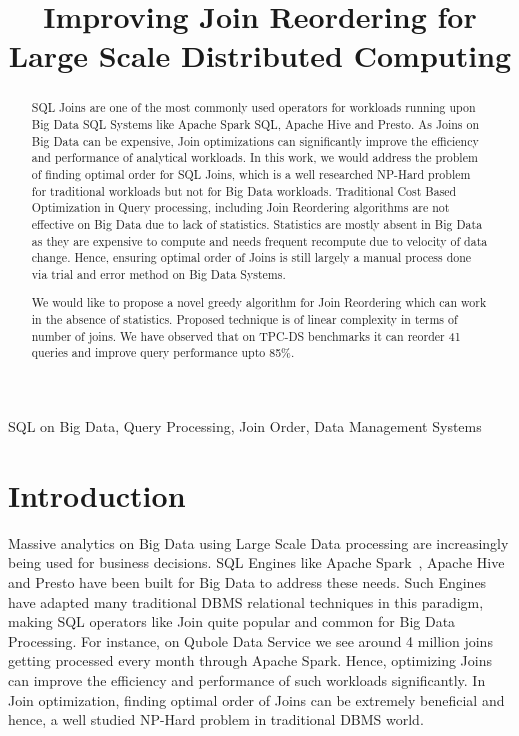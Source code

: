 \documentclass[conference]{IEEEtran}
\begin{document}
\title{Improving Join Reordering for Large Scale Distributed Computing\\
}

\author{
\and
{}
}

\maketitle

\begin{abstract}
 SQL Joins are one of the most commonly used operators for workloads running upon Big Data SQL Systems like Apache Spark SQL, Apache Hive and Presto. As Joins on Big Data can be expensive, Join optimizations can significantly improve the efficiency and performance of analytical workloads. In this work, we would address the problem of finding optimal order for SQL Joins, which is a well researched NP-Hard problem for traditional workloads but not for Big Data workloads. Traditional Cost Based Optimization in Query processing, including Join Reordering algorithms are not effective on Big Data due to lack of statistics. Statistics are mostly absent in Big Data as they are expensive to compute and needs frequent recompute due to velocity of data change. Hence, ensuring optimal order of Joins is still largely a manual process done via trial and error method on Big Data Systems.

We would like to propose a novel greedy algorithm for Join Reordering which can work in the absence of statistics. Proposed technique is of linear complexity in terms of number of joins. We have observed that on TPC-DS benchmarks it can reorder 41 queries and improve query performance upto 85\%.
\end{abstract}

\begin{IEEEkeywords}
SQL on Big Data, Query Processing, Join Order, Data Management Systems
\end{IEEEkeywords}

\section{Introduction}
Massive analytics on Big Data using Large Scale Data processing are increasingly being used for business decisions. SQL Engines like Apache Spark~\cite{b9}, Apache Hive~\cite{b10} and Presto have been built for Big Data to address these needs. Such Engines have adapted many traditional DBMS relational techniques in this paradigm, making SQL operators like Join quite popular and common for Big Data Processing. For instance, on Qubole Data Service we see around 4 million joins getting processed every month through Apache Spark. Hence, optimizing Joins can improve the efficiency and performance of such workloads significantly. In Join optimization, finding optimal order of Joins can be extremely beneficial and hence, a well studied NP-Hard problem in traditional DBMS world.
\end{document}
